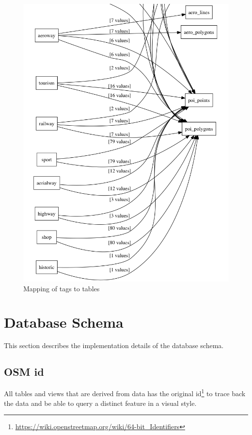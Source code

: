 \begin{figure}[H]
  \includegraphics[width=1\textwidth]{images/mapping_keys.png}
  \caption{Mapping of tags to tables}
\end{figure}



\section{Database Schema}

This section describes the implementation details of the database schema.

\subsection{OSM id}
All tables and views that are derived from \osm{} data has the original id\footnote{\url{https://wiki.openstreetmap.org/wiki/64-bit_Identifiers}}
to trace back the data and be able to query a distinct \osm{} feature in a visual style.

